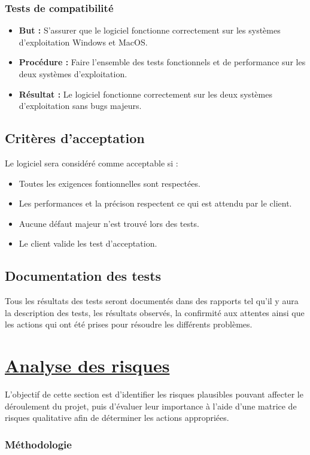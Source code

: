 \documentclass[11pt]{article}
\begin{document}
\subsubsection{Tests de compatibilité}
\begin{itemize}
  \item \textbf{But :} S'assurer que le logiciel fonctionne correctement sur les systèmes d'exploitation Windows et MacOS.
  \item \textbf{Procédure :} Faire l'ensemble des tests fonctionnels et de performance sur les deux systèmes d'exploitation.
  \item \textbf{Résultat :} Le logiciel fonctionne correctement sur les deux systèmes d'exploitation sans bugs majeurs.
\end{itemize}
\subsection{Critères d'acceptation}
Le logiciel sera considéré comme acceptable si :
\begin{itemize}
  \item Toutes les exigences fontionnelles sont respectées.
  \item Les performances et la précison respectent ce qui est attendu par le client.
  \item Aucune défaut majeur n'est trouvé lors des tests.
  \item Le client valide les test d'acceptation.
\end{itemize}
\subsection{Documentation des tests}
Tous les résultats des tests seront documentés dans des rapports tel qu'il y aura la description des tests, les résultats observés, la confirmité aux attentes ainsi que les actions qui ont été prises pour résoudre les différents problèmes.

\newpage
\section{\underline{Analyse des risques}}
L’objectif de cette section est d’identifier les risques plausibles pouvant affecter le déroulement du projet, puis d’évaluer leur importance à l’aide d’une matrice de risques qualitative afin de déterminer les actions appropriées.

\subsubsection*{Méthodologie}
\end{document}
